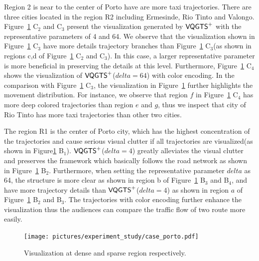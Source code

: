 Region 2 is near to the center of Porto have are more taxi trajectories. There are three cities located in the region R2 including Ermesinde, Rio Tinto and Valongo.
Figure~\ref{fig:porto} C$_2$ and C$_3$ present the visualization generated by $\mathsf{VQGTS}^{+}$ with the representative parameters of 4 and 64. We observe that the visualization shown in Figure~\ref{fig:porto} C$_3$ have more details trajectory branches than Figure~\ref{fig:porto} C$_3$(as shown in regions c,d of Figure~\ref{fig:porto} C$_2$ and C$_3$). In this case, a larger representative parameter is more beneficial in preserving the details at this level. Furthermore, Figure~\ref{fig:porto} C$_4$ shows the visualization of $\mathsf{VQGTS}^{+}$($delta = 64$) with color encoding. In the comparison with Figure~\ref{fig:porto} C$_3$, the visualization in Figure~\ref{fig:porto} further highlights the movement distribution.
For instance, we observe that region $f$ in Figure~\ref{fig:porto} C$_4$ has more deep colored trajectories than region $e$ and $g$, thus we inspect that city of Rio Tinto has more taxi trajectories than other two cities.

The region R1 is the center of Porto city, which has the highest concentration of the trajectories and cause serious visual clutter if all trajectories are visualized(as shown in Figure\ref{fig:porto} B$_1$). $\mathsf{VQGTS}^{+}$($delta = 4$) greatly alleviates the visual clutter and preserves the framework which basically follows the road network as shown in Figure~\ref{fig:porto} B$_2$. Furthermore, when setting the representative parameter $delta$ as 64, the structure is more clear as shown in region b of Figure~\ref{fig:porto} B$_3$ and B$_4$, and have more trajectory details than $\mathsf{VQGTS}^{+}$($delta = 4$) as shown in region $a$ of Figure~\ref{fig:porto} B$_2$ and B$_3$. The trajectories with color encoding further enhance the visualization thus the audiences can compare the traffic flow of two route more easily.



\begin{figure}[t]
	\centering
	\vspace{2mm}
	\texttt{[image: pictures/experiment\_study/case\_porto.pdf]}
	\caption{Visualization at dense and sparse region respectively.}
	\vspace{0mm}
	\label{fig:porto}
\end{figure}

